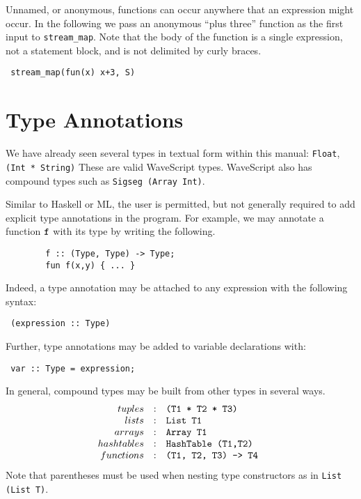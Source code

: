 \documentclass[twocolumn]{report}
\newenvironment{wscode}{\begin{center}\tt}{\end{center}}
\begin{document}
Unnamed, or anonymous, functions can occur anywhere that an expression
might occur. In the following we pass an anonymous ``plus three''
function as the first input to {\tt stream\_map}.  Note that the body
of the function is a single expression, not a statement block, and is
not delimited by curly braces.

\begin{wscode}
stream\_map(fun(x) x+3, S)
\end{wscode}




\section{Type Annotations}

We have already seen several types in textual form within this manual:
{\tt Float}, {\tt (Int * String)} These are valid WaveScript types.
WaveScript also has compound types such as {\tt Sigseg (Array Int)}.

Similar to Haskell or ML, the user is permitted, but not generally
required to add explicit type annotations in the program.  For
example, we may annotate a function {$\tt f$} with its type by writing
the following.
%
\begin{verbatim}
        f :: (Type, Type) -> Type;
        fun f(x,y) { ... }
\end{verbatim}

Indeed, a type annotation may be attached to any expression with
the following syntax:
\begin{wscode}
(expression :: Type)
\end{wscode}

Further, type annotations may be added to variable declarations with:
\begin{wscode}
 var :: Type = expression;
\end{wscode}

In general, compound types may be built from other types in several
ways.  
\[
\begin{array}{rcl}
tuples           & : & $\tt (T1 * T2 * T3) $   \\
lists            & : & $\tt List T1 $ \\
arrays           & : & $\tt Array T1 $ \\
hashtables       & : & $\tt HashTable (T1,T2) $ \\
functions        & : & $\tt (T1, T2, T3) -> T4 $ \\
\end{array}
\]
Note that parentheses must be used when nesting type
constructors as in {\tt List (List T)}.
\end{document}
